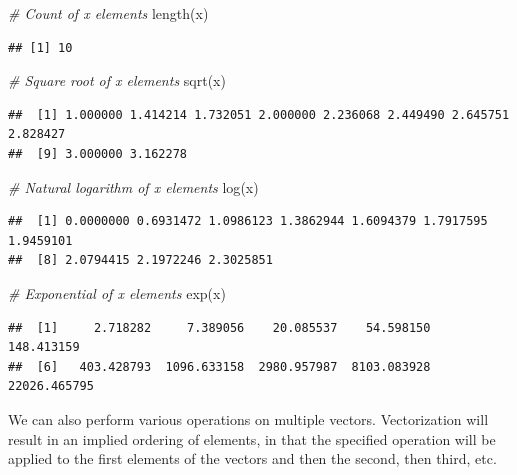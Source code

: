 \documentclass[
]{book}
\newenvironment{Shaded}{\begin{snugshade}}{\end{snugshade}}
\newcommand{\CommentTok}[1]{\textcolor[rgb]{0.56,0.35,0.01}{\textit{#1}}}
\newcommand{\FunctionTok}[1]{\textcolor[rgb]{0.00,0.00,0.00}{#1}}
\newcommand{\NormalTok}[1]{#1}
\begin{document}
\begin{Shaded}
\begin{Highlighting}[]
\CommentTok{\# Count of x elements}
\FunctionTok{length}\NormalTok{(x)}
\end{Highlighting}
\end{Shaded}

\begin{verbatim}
## [1] 10
\end{verbatim}

\begin{Shaded}
\begin{Highlighting}[]
\CommentTok{\# Square root of x elements}
\FunctionTok{sqrt}\NormalTok{(x)}
\end{Highlighting}
\end{Shaded}

\begin{verbatim}
##  [1] 1.000000 1.414214 1.732051 2.000000 2.236068 2.449490 2.645751 2.828427
##  [9] 3.000000 3.162278
\end{verbatim}

\begin{Shaded}
\begin{Highlighting}[]
\CommentTok{\# Natural logarithm of x elements}
\FunctionTok{log}\NormalTok{(x)}
\end{Highlighting}
\end{Shaded}

\begin{verbatim}
##  [1] 0.0000000 0.6931472 1.0986123 1.3862944 1.6094379 1.7917595 1.9459101
##  [8] 2.0794415 2.1972246 2.3025851
\end{verbatim}

\begin{Shaded}
\begin{Highlighting}[]
\CommentTok{\# Exponential of x elements}
\FunctionTok{exp}\NormalTok{(x)}
\end{Highlighting}
\end{Shaded}

\begin{verbatim}
##  [1]     2.718282     7.389056    20.085537    54.598150   148.413159
##  [6]   403.428793  1096.633158  2980.957987  8103.083928 22026.465795
\end{verbatim}

We can also perform various operations on multiple vectors. Vectorization will result in an implied ordering of elements, in that the specified operation will be applied to the first elements of the vectors and then the second, then third, etc.
\end{document}
